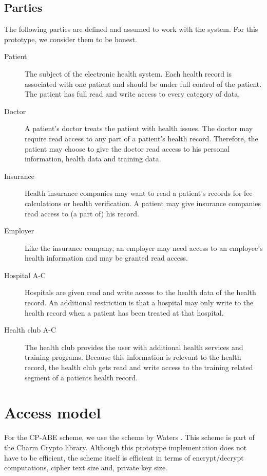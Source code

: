 \documentclass[a4paper]{article}
\begin{document}
	\subsection{Parties}
		The following parties are defined and assumed to work with the system. For this prototype, we consider them to be honest.
		
		\begin{description}
			\item[Patient] The subject of the electronic health system. Each health record is associated with one patient and should be under full control of the patient. The patient has full read and write access to every category of data.
			\item[Doctor] A patient's doctor treats the patient with health issues. The doctor may require read access to any part of a patient's health record. Therefore, the patient may choose to give the doctor read access to his personal information, health data and training data.
			\item[Insurance] Health insurance companies may want to read a patient's records for fee calculations or health verification. A patient may give insurance companies read access to (a part of) his record.
			\item[Employer] Like the insurance company, an employer may need access to an employee's health information and may be granted read access.  
			\item[Hospital A-C] Hospitals are given read and write access to the health data of the health record. An additional restriction is that a hospital may only write to the health record when a patient has been treated at that hospital.
			\item[Health club A-C] The health club provides the user with additional health services and training programs. Because this information is relevant to the health record, the health club gets read and write access to the training related segment of a patients health record.
		\end{description}

\section{Access model}
	For the CP-ABE scheme, we use the scheme by Waters \cite{waters2011ciphertext}. This scheme is part of the Charm Crypto library. Although this prototype implementation does not have to be efficient, the scheme itself is efficient in terms of encrypt/decrypt computations, cipher text size and, private key size.
	
\end{document}
